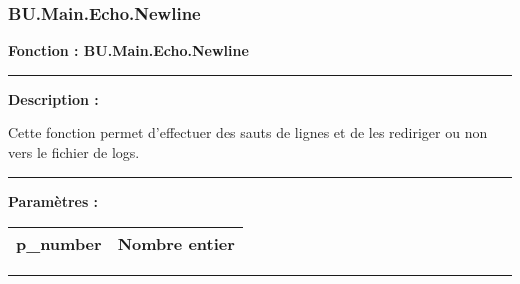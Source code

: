 \documentclass[a4paper,10pt]{article}
\begin{document}
    \color{sec3}
    \subsubsection{BU.Main.Echo.Newline}\color{text}

    \begin{justify}
        \textbf{Fonction : \textbf{\color{func}BU.Main.Echo.Newline}}
    \end{justify}


    \par\noindent\rule{\textwidth}{0.4pt}

    \begin{justify}
        \textbf{Description :}

        Cette fonction permet d'effectuer des sauts de lignes et de les rediriger ou non vers le fichier de logs.
    \end{justify}


    \par\noindent\rule{\textwidth}{0.4pt}

    \begin{justify}
        \textbf{Paramètres :}

        \begin{tabular}{|l|l|}
            \hline
            \textbf{\color{vars}p\_number} & Nombre entier\\
            \hline
        \end{tabular}
    \end{justify}


    \par\noindent\rule{\textwidth}{0.4pt}
\end{document}
